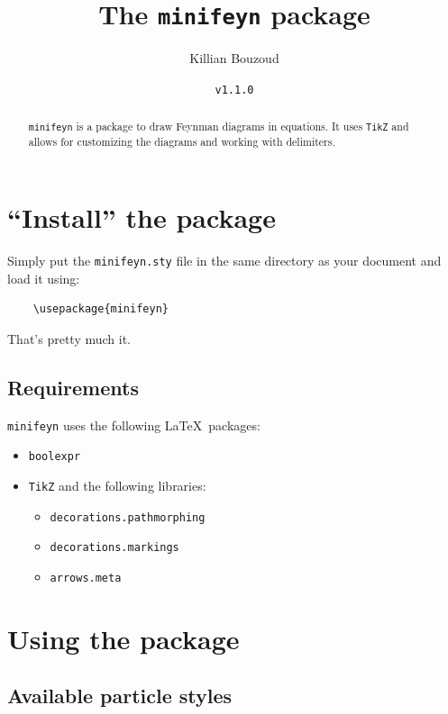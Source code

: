 \documentclass[11pt,a4paper]{article}
\author{Killian Bouzoud}
\title{The \texttt{minifeyn} package}
\date{\texttt{v1.1.0}}
\begin{document}
\maketitle

\begin{abstract}
    \texttt{minifeyn} is a package to draw Feynman diagrams in equations.
    It uses \texttt{TikZ} and allows for customizing the diagrams and working with delimiters.
\end{abstract}

\tableofcontents

\newpage

\section{``Install'' the package}

Simply put the \texttt{minifeyn.sty} file in the same directory as your document and load it using:
\begin{verbatim}
    \usepackage{minifeyn}
\end{verbatim}
That's pretty much it.

\subsection{Requirements}

\texttt{minifeyn} uses the following \LaTeX~packages:
\begin{itemize}
    \item \texttt{boolexpr}
    \item \texttt{TikZ} and the following libraries:
    \begin{itemize}
        \item \texttt{decorations.pathmorphing}
        \item \texttt{decorations.markings}
        \item \texttt{arrows.meta}
    \end{itemize}
\end{itemize}

\section{Using the package}

\subsection{Available particle styles}
\label{sec:particlestyles}
\end{document}
